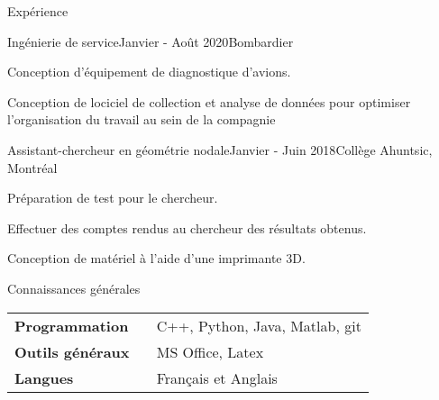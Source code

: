 \documentclass[french,12pt]{resume} %
\begin{document}
	\begin{rSection}{Expérience}
		
		\begin{rSubsection}{Ingénierie de service}{Janvier - Août 2020}{Bombardier}{}{}
			\item Conception d'équipement de diagnostique d'avions.
			\item Conception de lociciel de collection et analyse de données pour optimiser l'organisation du travail au sein de la compagnie
		\end{rSubsection}
		
		\begin{rSubsection}{Assistant-chercheur en géométrie nodale}{Janvier - Juin 2018}{Collège Ahuntsic, Montréal}{}
			\item   Préparation de test pour le chercheur.
			\item   Effectuer des comptes rendus au chercheur des résultats obtenus.
			\item   Conception de matériel à l’aide d’une imprimante 3D.
		\end{rSubsection}
		
		
	\end{rSection}
	
	

	
	\begin{rSection}{Connaissances générales}
		
		\begin{tabular}{ @{} >{\bfseries}l @{\hspace{6ex}} l }
			Programmation \              & C++, Python, Java, Matlab, git \\
			Outils généraux                 & MS Office, Latex \\
			Langues & Français et Anglais
		\end{tabular}
		
	\end{rSection}
	
	
\end{document}
